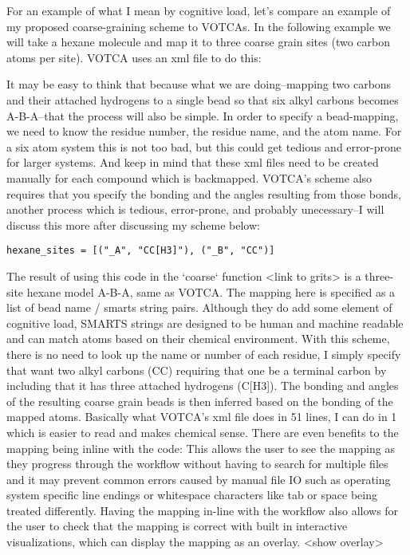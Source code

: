 For an example of what I mean by cognitive load, let's compare an example of my proposed coarse-graining scheme to VOTCAs.
In the following example we will take a hexane molecule and map it to three coarse grain sites (two carbon atoms per site).
VOTCA uses an xml file to do this:

It may be easy to think that because what we are doing--mapping two carbons and their attached hydrogens to a single bead so that six alkyl carbons becomes A-B-A--that the process will also be simple.
In order to specify a bead-mapping, we need to know the residue number, the residue name, and the atom name.
For a six atom system this is not too bad, but this could get tedious and error-prone for larger systems.
And keep in mind that these xml files need to be created manually for each compound which is backmapped.
VOTCA's scheme also requires that you specify the bonding and the angles resulting from those bonds, another process which is tedious, error-prone, and probably unecessary--I will discuss this more after discussing my scheme below:
\begin{lstlisting}
hexane_sites = [("_A", "CC[H3]"), ("_B", "CC")]
\end{lstlisting}
The result of using this code in the `coarse` function <link to grits> is a three-site hexane model A-B-A, same as VOTCA.
The mapping here is specified as a list of bead name / smarts string pairs.
Although they do add some element of cognitive load, SMARTS strings are designed to be human and machine readable and can match atoms based on their chemical environment.
With this scheme, there is no need to look up the name or number of each residue, I simply specify that want two alkyl carbons (CC) requiring that one be a terminal carbon by including that it has three attached hydrogens (C[H3]).
The bonding and angles of the resulting coarse grain beads is then inferred based on the bonding of the mapped atoms.
Basically what VOTCA's xml file does in 51 lines, I can do in 1 which is easier to read and makes chemical sense. 
There are even benefits to the mapping being inline with the code:
This allows the user to see the mapping as they progress through the workflow without having to search for multiple files and it may prevent common errors caused by manual file IO such as operating system specific line endings or whitespace characters like tab or space being treated differently.
Having the mapping in-line with the workflow also allows for the user to check that the mapping is correct with built in interactive visualizations, which can display the mapping as an overlay. <show overlay>

